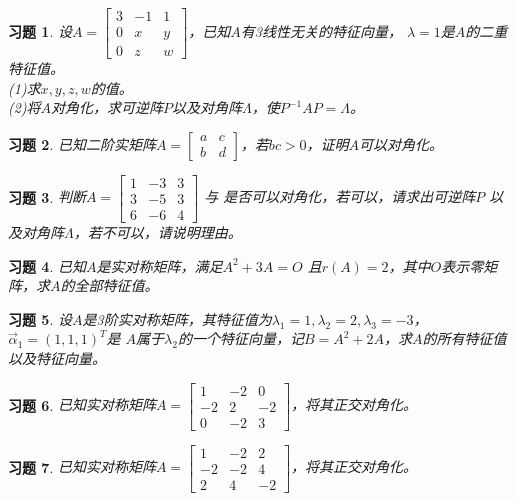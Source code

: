 \documentclass[a4paper]{book}
\newtheorem{ex}{习题}[chapter]
\begin{document}
\begin{ex}\label{7.18}
设$A=\begin{bmatrix}3&-1&1\\0&x&y\\0&z&w\end{bmatrix}$，已知$A$有3线性无关的特征向量，
$\lambda=1$是$A$的二重特征值。\\
(1)求$x,y,z,w$的值。\\
(2)将$A$对角化，求可逆阵$P$以及对角阵$\Lambda$，使$P^{-1}AP=\Lambda$。
\end{ex}

\begin{ex}\label{7.19}
已知二阶实矩阵$A=\begin{bmatrix}a&c\\b&d\end{bmatrix}$，若$bc>0$，证明$A$可以对角化。
\end{ex}

\begin{ex}\label{7.20}
判断$A=\begin{bmatrix}1&-3&3\\3&-5&3\\6&-6&4\end{bmatrix}$ 与
是否可以对角化，若可以，请求出可逆阵$P$ 以及对角阵$\Lambda$，若不可以，请说明理由。
\end{ex}

\begin{ex}\label{7.21}
已知$A$是实对称矩阵，满足$A^2+3A=O$ 且$r(A)=2$，其中$O$表示零矩阵，求$A$的全部特征值。
\end{ex}

\begin{ex}\label{7.22}
设$A$是3阶实对称矩阵，其特征值为$\lambda_1=1,\lambda_2=2,\lambda_3=-3$，$\vec{\alpha}_1=(1,1,1)^T$是
$A$属于$\lambda_2$的一个特征向量，记$B=A^2+2A$，求$A$的所有特征值以及特征向量。
\end{ex}

\begin{ex}\label{7.23}
已知实对称矩阵$A=\begin{bmatrix}1&-2&0\\-2&2&-2\\0&-2&3\end{bmatrix}$，将其正交对角化。
\end{ex}

\begin{ex}\label{7.24}
已知实对称矩阵$A=\begin{bmatrix}1&-2&2\\-2&-2&4\\2&4&-2\end{bmatrix}$，将其正交对角化。
\end{ex}
\end{document}
